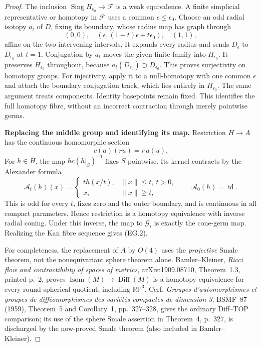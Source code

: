 \begin{proof}
The inclusion $\operatorname{Sing}H_{\epsilon_0}\to\mathcal F$ is a
weak equivalence. A finite simplicial representative or homotopy in
$\mathcal F$ uses a common $\epsilon\le\epsilon_0$. Choose an odd radial
isotopy $a_t$ of $D$, fixing its boundary, whose radius map has graph
through
\[
 (0,0),\quad
 (\epsilon,(1-t)\epsilon+t\epsilon_0),\quad(1,1),
\]
affine on the two intervening intervals. It expands every radius and
sends $D_\epsilon$ to $D_{\epsilon_0}$ at $t=1$.
Conjugation by $a_t$ moves the given finite family into
$H_{\epsilon_0}$. It preserves $H_{\epsilon_0}$ throughout, because
$a_t(D_{\epsilon_0})\supset D_{\epsilon_0}$. This proves surjectivity on
homotopy groups. For injectivity, apply it to a null-homotopy with one
common $\epsilon$ and attach the boundary conjugation track, which lies
entirely in $H_{\epsilon_0}$. The same argument treats components.
Identity basepoints remain fixed. This identifies the full homotopy
fibre, without an incorrect contraction through merely pointwise germs.

\textbf{Replacing the middle group and identifying its map.}\quad
Restriction $H\to A$ has the continuous homomorphic section
\[
 c(a)(ru)=r\,a(u).
\]
For $h\in H$, the map $h c(h|_S)^{-1}$ fixes $S$ pointwise. Its kernel
contracts by the Alexander formula
\[
 \mathcal A_t(h)(x)=
 \begin{cases}t h(x/t),&\|x\|\le t,\ t>0,\\
 x,&\|x\|\ge t,
 \end{cases}
 \qquad \mathcal A_0(h)=\operatorname{id}.
\]
This is odd for every $t$, fixes zero and the outer boundary, and is
continuous in all compact parameters. Hence restriction is a homotopy
equivalence with inverse radial coning. Under this inverse, the map to
$\mathcal G_\iota$ is exactly the cone-germ map. Realizing the Kan fibre
sequence gives (EG.2).

For completeness, the replacement of $A$ by $O(4)$ uses the
\emph{projective} Smale theorem, not the nonequivariant sphere theorem
alone. Bamler--Kleiner, \emph{Ricci flow and contractibility of spaces of
metrics}, arXiv:1909.08710, Theorem~1.3, printed p.~2, proves
$\operatorname{Isom}(M)\to\operatorname{Diff}(M)$ is a homotopy equivalence
for every round spherical quotient, including $\mathbb {RP}^3$.
Cerf, \emph{Groupes d'automorphismes et groupes de diff\'eomorphismes des
vari\'et\'es compactes de dimension 3}, BSMF~87 (1959), Theorem~5 and
Corollary~1, pp.~327--328, gives the ordinary Diff--TOP comparison;
its use of the sphere Smale assertion in Theorem~4, p.~327, is discharged
by the now-proved Smale theorem (also included in Bamler--Kleiner).


\end{proof}
